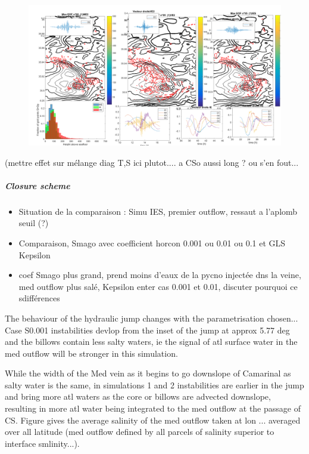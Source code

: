 \begin{figure}[!h]
 \includegraphics[width=\textwidth]{./GBR3D/EOF5_MIV_2D.png}
 \caption {}
\end{figure}

(mettre effet sur mélange diag T,S ici plutot.... a CSo aussi long ? ou s'en fout...


\subparagraph{Closure scheme}

\begin{itemize}
\item Situation de la comparaison : Simu IES, premier outflow, ressaut a l'aplomb seuil (?)
\item Comparaison, Smago avec coefficient horcon 0.001 ou 0.01 ou 0.1  et GLS Kepsilon
\item coef Smago plus grand, prend moins d'eaux de la pycno injectée dns la veine, med outflow plus salé, Kepsilon enter cas 0.001 et 0.01, discuter pourquoi ce sdifférences
\end{itemize}

The behaviour of the hydraulic jump changes with the parametrisation chosen... Case S0.001 instabilities devlop from the inset of the jump at approx 5.77 deg and the billows contain less salty waters, ie the signal of atl surface water in the med outflow will be stronger in this simulation.


While the width of the Med vein as it begins to go downslope of Camarinal as salty water is the same, in simulations 1 and 2 instabilities are earlier in the jump and bring more atl waters as the core or billows are advected downslope, resulting in more atl water being integrated to the med outflow at the passage of CS. Figure gives the average salinity of the med outflow taken at lon ... averaged over all latitude (med outflow defined by all parcels of salinity superior to interface smlinity...).

